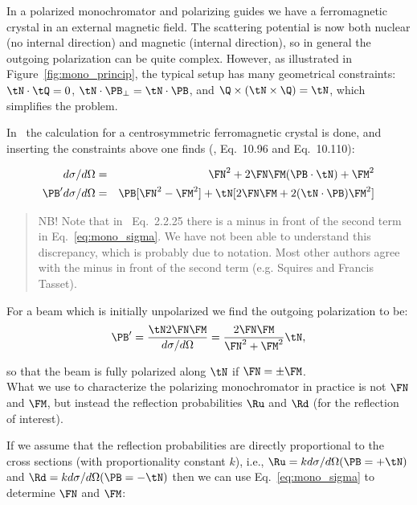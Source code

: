 In a polarized monochromator and polarizing guides we have a ferromagnetic
crystal in an external magnetic field. The scattering potential is now both
nuclear (no internal direction) and magnetic (internal direction), so in
general the outgoing polarization can be quite complex. However, as
illustrated in Figure~\ref{fig:mono_princip}, the typical setup has many
geometrical constraints: $\tN \cdot \tQ = 0$, $\tN \cdot \PB_\perp = \tN \cdot
\PB$, and $\Q \times (\tN \times \Q) = \tN$, which simplifies the problem.

In~\cite{lovesey84} the calculation for a centrosymmetric ferromagnetic
crystal is done, and inserting the constraints above one finds
(\cite{lovesey84}, Eq.~10.96 and Eq.~10.110):

\begin{eqnarray}
  \label{eq:mono_sigma}
  d\sigma/d\Omega & = & \FN^2 + 2\FN\FM (\PB \cdot \tN) + \FM^2\\
  \label{eq:mono_pol}
  \PB' d\sigma/d\Omega & =
  & \PB [\FN^2 - \FM^2] + \tN [2\FN\FM + 2(\tN \cdot \PB)\FM^2]
\end{eqnarray}

\begin{quote}
  NB! Note that in~\cite{gavin} Eq.~2.2.25 there is a minus in front of the
  second term in Eq.~\ref{eq:mono_sigma}. We have not been able to understand
  this discrepancy, which is probably due to notation. Most other authors
  agree with the minus in front of the second term (e.g. Squires and Francis
  Tasset).
\end{quote}

For a beam which is initially unpolarized we find the outgoing
polarization to be:
\begin{equation}
  \PB' = \frac{\tN 2\FN \FM}{d\sigma/d\Omega}
  = \frac{2\FN\FM}{\FN^2 + \FM^2} \tN,
\end{equation}

so that the beam is fully polarized along $\tN$ if $\FN = \pm \FM$. \\

What we use to characterize the polarizing monochromator in practice
is not $\FN$ and $\FM$, but instead the reflection probabilities $\Ru$
and $\Rd$ (for the reflection of interest).

If we assume that the reflection probabilities are directly proportional to
the cross sections (with proportionality constant $k$), i.e., $\Ru = k
d\sigma/d\Omega(\PB=+\tN)$ and $\Rd = k d\sigma/d\Omega(\PB=-\tN)$ then we can
use Eq.~\ref{eq:mono_sigma} to determine $\FN$ and $\FM$:

